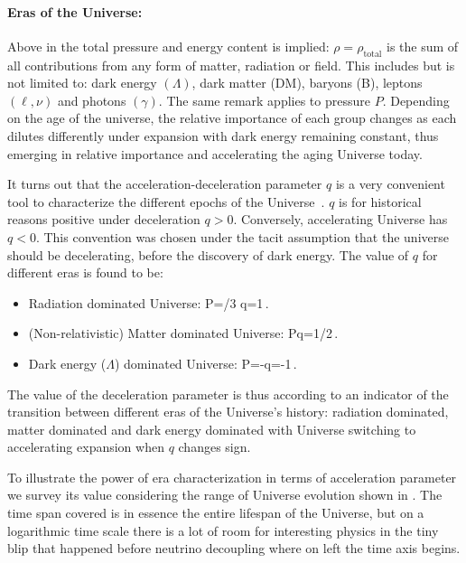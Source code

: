 {%
\paragraph{Eras of the Universe:} %
Above in  the total pressure and energy content is implied: $\rho=\rho_\mathrm{total}$ is the sum of all contributions from any form of matter, radiation or field. This includes but is not limited to: dark energy $(\Lambda)$, dark matter (DM), baryons (B), leptons $(\ell,\nu)$ and photons $(\gamma)$. The same remark applies to pressure $P$. Depending on the age of the universe, the relative importance of each group changes as each dilutes differently under expansion with dark energy remaining constant, thus emerging in relative importance and accelerating the aging Universe today. 

It turns out that the acceleration-deceleration parameter $q$  is a very convenient tool to characterize the different epochs of the Universe~\cite{Rafelski:2013yka}. $q$ is for historical reasons positive under deceleration $q>0$. Conversely, accelerating Universe has $q<0$. This convention was chosen under the tacit assumption that the universe should be decelerating, before the discovery of dark energy. The value of $q$ for different eras is found to be:
\begin{itemize}
\item Radiation dominated Universe: 
P=\rho/3 \implies q=1\,.
\eeqn
\item (Non-relativistic) Matter dominated Universe: 
P\ll\rho \implies q=1/2\,.
\eeqn
\item Dark energy ($\Lambda$) dominated Universe: 
P=-\rho \implies q=-1\,.
\eeqn
\end{itemize}
The value of the deceleration parameter is thus according to  an indicator of the transition between different eras of the Universe's history: radiation dominated, matter dominated and dark energy dominated with Universe switching to accelerating expansion when $q$ changes sign.

To illustrate the power of era characterization in terms of acceleration parameter we survey its value considering the range of Universe evolution shown in . The time span covered  is in essence the entire lifespan of the Universe, but on a logarithmic time scale there is a lot of room for interesting physics in the tiny blip that happened before neutrino decoupling where on left the time axis begins. 

}
